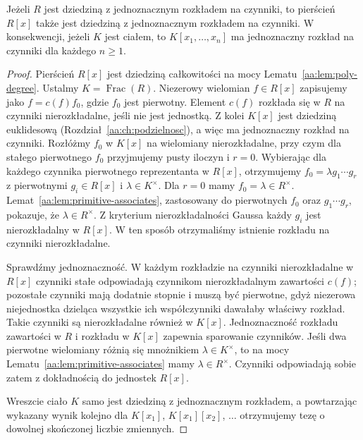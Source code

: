 \begin{twierdzenie}
\label{aa:tw:ufd-polynomial}
Jeżeli $R$ jest dziedziną z jednoznacznym rozkładem
na czynniki, to pierścień $R[x]$ także jest dziedziną
z jednoznacznym rozkładem na czynniki. W konsekwencji,
jeżeli $K$ jest ciałem, to $K[x_1,\ldots,x_n]$
ma jednoznaczny rozkład na czynniki dla każdego $n\ge1$.
\end{twierdzenie}
\begin{proof}
Pierścień $R[x]$ jest dziedziną całkowitości na mocy
Lematu~\ref{aa:lem:poly-degree}. Ustalmy
$K=\operatorname{Frac}(R)$. Niezerowy wielomian
$f\in R[x]$ zapisujemy jako $f=c(f)f_0$,
gdzie $f_0$ jest pierwotny. Element $c(f)$ rozkłada się
w $R$ na czynniki nierozkładalne, jeśli nie jest jednostką.
Z kolei $K[x]$ jest dziedziną euklidesową
(Rozdział~\ref{aa:ch:podzielnosc}), a więc ma
jednoznaczny rozkład na czynniki. Rozłóżmy $f_0$ w $K[x]$
na wielomiany nierozkładalne, przy czym dla stałego
pierwotnego $f_0$ przyjmujemy pusty iloczyn i $r=0$.
Wybierając dla każdego czynnika pierwotnego reprezentanta
w $R[x]$, otrzymujemy $f_0=\lambda g_1\cdots g_r$
z pierwotnymi $g_i\in R[x]$ i $\lambda\in K^\times$.
Dla $r=0$ mamy $f_0=\lambda\in R^\times$.
Lemat~\ref{aa:lem:primitive-associates}, zastosowany do
pierwotnych $f_0$ oraz $g_1\cdots g_r$, pokazuje,
że $\lambda\in R^\times$.
Z kryterium nierozkładalności Gaussa każdy $g_i$ jest
nierozkładalny w $R[x]$. W ten sposób otrzymaliśmy
istnienie rozkładu na czynniki nierozkładalne.

Sprawdźmy jednoznaczność. W każdym rozkładzie na czynniki
nierozkładalne w $R[x]$ czynniki stałe odpowiadają
czynnikom nierozkładalnym zawartości $c(f)$; pozostałe
czynniki mają dodatnie stopnie i muszą być pierwotne,
gdyż niezerowa niejednostka dzieląca wszystkie ich
współczynniki dawałaby właściwy rozkład.
Takie czynniki są nierozkładalne również w $K[x]$.
Jednoznaczność rozkładu zawartości w $R$ i rozkładu
w $K[x]$ zapewnia sparowanie czynników.
Jeśli dwa pierwotne wielomiany różnią się mnożnikiem
$\lambda\in K^\times$, to na mocy
Lematu~\ref{aa:lem:primitive-associates} mamy
$\lambda\in R^\times$. Czynniki odpowiadają sobie
zatem z dokładnością do jednostek $R[x]$.

Wreszcie ciało $K$ samo jest dziedziną z jednoznacznym
rozkładem, a powtarzając wykazany wynik kolejno dla
$K[x_1]$, $K[x_1][x_2]$, $\ldots$ otrzymujemy tezę
o dowolnej skończonej liczbie zmiennych.
\end{proof}

